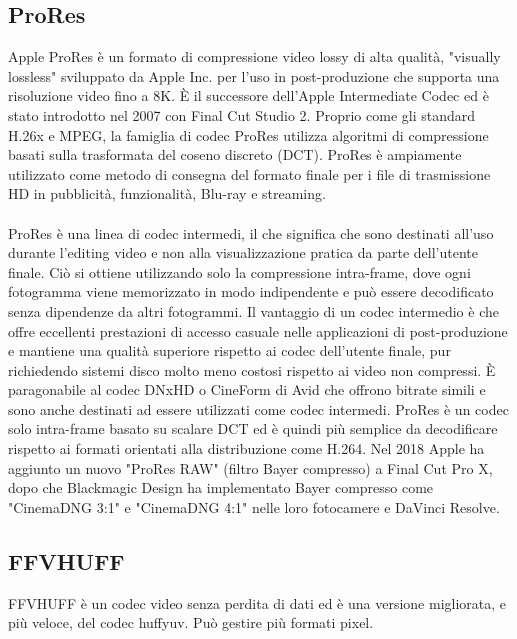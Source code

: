 \subsection{ProRes}
Apple ProRes è un formato di compressione video lossy di alta qualità, "visually lossless" sviluppato da Apple Inc. per l'uso in post-produzione che supporta una risoluzione video fino a 8K. È il successore dell'Apple Intermediate Codec ed è stato introdotto nel 2007 con Final Cut Studio 2. Proprio come gli standard H.26x e MPEG, la famiglia di codec ProRes utilizza algoritmi di compressione basati sulla trasformata del coseno discreto (DCT). ProRes è ampiamente utilizzato come metodo di consegna del formato finale per i file di trasmissione HD in pubblicità, funzionalità, Blu-ray e streaming.
\\
\\
ProRes è una linea di codec intermedi, il che significa che sono destinati all'uso durante l'editing video e non alla visualizzazione pratica da parte dell'utente finale. Ciò si ottiene utilizzando solo la compressione intra-frame, dove ogni fotogramma viene memorizzato in modo indipendente e può essere decodificato senza dipendenze da altri fotogrammi. Il vantaggio di un codec intermedio è che offre eccellenti prestazioni di accesso casuale nelle applicazioni di post-produzione e mantiene una qualità superiore rispetto ai codec dell'utente finale, pur richiedendo sistemi disco molto meno costosi rispetto ai video non compressi. È paragonabile al codec DNxHD o CineForm di Avid che offrono bitrate simili e sono anche destinati ad essere utilizzati come codec intermedi. ProRes è un codec solo intra-frame basato su scalare DCT ed è quindi più semplice da decodificare rispetto ai formati orientati alla distribuzione come H.264. Nel 2018 Apple ha aggiunto un nuovo "ProRes RAW" (filtro Bayer compresso) a Final Cut Pro X, dopo che Blackmagic Design ha implementato Bayer compresso come "CinemaDNG 3:1" e "CinemaDNG 4:1" nelle loro fotocamere e DaVinci Resolve\cite{ProRes}.


\subsection{FFVHUFF}
FFVHUFF è un codec video senza perdita di dati ed è una versione migliorata, e più veloce, del codec huffyuv. Può gestire più formati pixel\cite{ffvhuff}.

